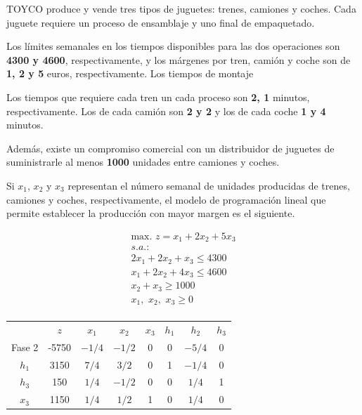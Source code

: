 TOYCO produce y vende tres tipos de juguetes: trenes, camiones y coches. 
Cada juguete requiere un proceso de ensamblaje y uno final de empaquetado. 

Los límites semanales  en los tiempos disponibles para las dos operaciones son \textbf{4300 y 4600}, respectivamente, y los márgenes por tren, camión y coche son de \textbf{1, 2 y 5 }euros, respectivamente. Los tiempos de montaje

Los tiempos que requiere cada tren un cada proceso son \textbf{2, 1} minutos, respectivamente. Los de cada camión son \textbf{2 y 2} y los de cada coche \textbf{1 y 4} minutos.

Además, existe un compromiso comercial con un distribuidor de juguetes de suministrarle al menos \textbf{1000} unidades entre camiones y coches.

Si $x_1$, $x_2$ y $x_3$ representan el número semanal de unidades producidas de trenes, camiones y coches, respectivamente, el modelo de programación lineal que permite establecer la producción con mayor margen es el siguiente.

\begin{equation}
\begin{split}
\mbox{max. } z =  x_1 + 2x_2 + 5x_3\\
s.a.:\\
2x_1 + 2x_2 +  x_3 \leq 4300\\
 x_1 + 2x_2 + 4x_3 \leq 4600\\
        x_2 +  x_3 \geq 1000\\
x_1,\,\,x_2,\,\,x_3\geq 0\\
\end{split}
\end{equation}

\begin{center}
\begin{tabular}{c|c|cccccc|}
 & $z$ & $x_1$ & $x_2$ & $x_3$ & $h_1$ & $h_2$ & $h_3$\\ 
Fase 2 & -5750 & $-1/4$ & $-1/2$ & 0 & 0 & $-5/4$ & 0 \\ 
\hline
$h_1$ & 3150  & $7/4$ & $3/2$ & 0 & 1 & $-1/4$ & 0\\ 
$h_3$ & 150  & $1/4$ & $-1/2$ & 0 & 0 & $1/4$ & 1\\ 
$x_3$ & 1150  & $1/4$ & $1/2$ & 1 & 0 & $1/4$ & 0\\ 
\hline
\end{tabular}
\end{center}





